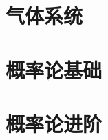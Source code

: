 \documentclass[hyperref,UTF8]{ctexbook}
\begin{document}
\chapter{气体系统}
\newpage
\appendix
\chapter{概率论基础}\label{A}
\chapter{概率论进阶}\label{B}
\end{document}
